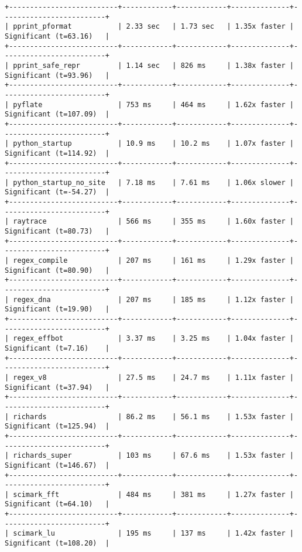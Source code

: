 \begin{code}
\begin{verbatim}
+--------------------------+------------+------------+--------------+-------------------------+
| pprint_pformat           | 2.33 sec   | 1.73 sec   | 1.35x faster | Significant (t=63.16)   |
+--------------------------+------------+------------+--------------+-------------------------+
| pprint_safe_repr         | 1.14 sec   | 826 ms     | 1.38x faster | Significant (t=93.96)   |
+--------------------------+------------+------------+--------------+-------------------------+
| pyflate                  | 753 ms     | 464 ms     | 1.62x faster | Significant (t=107.09)  |
+--------------------------+------------+------------+--------------+-------------------------+
| python_startup           | 10.9 ms    | 10.2 ms    | 1.07x faster | Significant (t=114.92)  |
+--------------------------+------------+------------+--------------+-------------------------+
| python_startup_no_site   | 7.18 ms    | 7.61 ms    | 1.06x slower | Significant (t=-54.27)  |
+--------------------------+------------+------------+--------------+-------------------------+
| raytrace                 | 566 ms     | 355 ms     | 1.60x faster | Significant (t=80.73)   |
+--------------------------+------------+------------+--------------+-------------------------+
| regex_compile            | 207 ms     | 161 ms     | 1.29x faster | Significant (t=80.90)   |
+--------------------------+------------+------------+--------------+-------------------------+
| regex_dna                | 207 ms     | 185 ms     | 1.12x faster | Significant (t=19.90)   |
+--------------------------+------------+------------+--------------+-------------------------+
| regex_effbot             | 3.37 ms    | 3.25 ms    | 1.04x faster | Significant (t=7.16)    |
+--------------------------+------------+------------+--------------+-------------------------+
| regex_v8                 | 27.5 ms    | 24.7 ms    | 1.11x faster | Significant (t=37.94)   |
+--------------------------+------------+------------+--------------+-------------------------+
| richards                 | 86.2 ms    | 56.1 ms    | 1.53x faster | Significant (t=125.94)  |
+--------------------------+------------+------------+--------------+-------------------------+
| richards_super           | 103 ms     | 67.6 ms    | 1.53x faster | Significant (t=146.67)  |
+--------------------------+------------+------------+--------------+-------------------------+
| scimark_fft              | 484 ms     | 381 ms     | 1.27x faster | Significant (t=64.10)   |
+--------------------------+------------+------------+--------------+-------------------------+
| scimark_lu               | 195 ms     | 137 ms     | 1.42x faster | Significant (t=108.20)  |

\end{verbatim}
\end{code}
